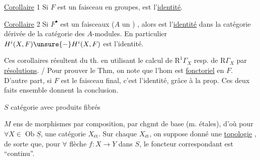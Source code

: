 \uline{Corollaire} 1 Si $F$ est un faisceau en groupes,
est l'\uline{identité}.

\uline{Corollaire} 2 Si $F^\bullet$ est un  faisceaux   ($A$ un  ) , alors
est l'\uline{identité} dans la catégorie  dérivée de la catégorie des $A$-modules.
En particulier $H^i(X,F)\unsure{\mathbin{-}}H^i(X,F)$ est l'identité.

Ces corollaires résultent du th. en utilisant le calcul de $\mathrm R^1\Gamma_X$ resp. de $\mathrm R\Gamma_X$ par \uline{résolutions}. / Pour prouver le Thm, on note que   l'hom
est \uline{fonctoriel} en $F$. D'autre part, si $F$ est le faisceau final, c'est l'identité, grâce à la prop. Ces deux faits ensemble donnent  la conclusion.

$S$ catégorie avec produits fibrés

$M$ ens de morphismes  par composition, par chgmt de base (m.  étales), d'où pour $\forall X\in\operatorname{Ob}\underline S$, une catégorie $X_{\text{ét}}$.
Sur chaque $X_{\text{ét}}$, on suppose donné une \uline{topologie} , de sorte que,  pour $\forall$ flèche $f:X\to Y$ dans $S$, le foncteur correspondant
est ``continu''.

